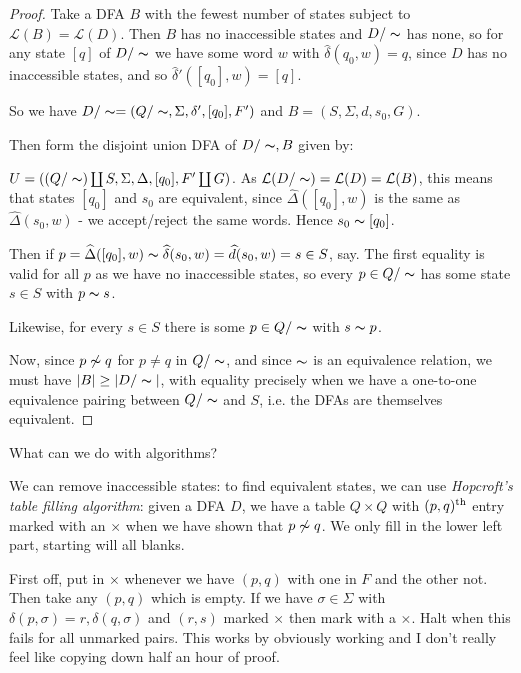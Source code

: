 \documentclass[10pt,a4paper]{article}
\begin{document}
\begin{proof}
Take a DFA $B$ with the fewest number of states subject to $\mathcal{L}(B) = \mathcal{L}(D)$. Then $B$ has no inaccessible states and $D/\thicksim$ has none, so for any state $[q]$ of $D/\thicksim$ we have some word $w$ with $\hat{\delta}(q_0, w) = q$, since $D$ has no inaccessible states, and so $\hat{\delta}'([q_0],w) = [q]$.

So we have $D/\thicksim = (Q/\thicksim, \Sigma, \delta', [q_0], F')$ and $B = (S,\Sigma, d, s_0, G)$.

Then form the disjoint union DFA of $D/\thicksim, B$ given by:

$U = ((Q/\thicksim )\coprod S, \Sigma, \Delta, [q_0], F'\coprod G)$. As $\mathcal{L}(D/\thicksim) = \mathcal{L}(D) = \mathcal{L}(B)$, this means that states $[q_0]$ and $s_0$ are equivalent, since $\hat{\Delta}([q_0],w)$ is the same as $\hat{\Delta}(s_0, w)$ - we accept/reject the same words. Hence $s_0 \thicksim [q_0]$.

Then if $p = \hat{\Delta}([q_0],w) \thicksim \hat{\delta}(s_0, w) = \hat{d}(s_0, w) = s \in S$, say. The first equality is valid for all $p$ as we have no inaccessible states, so every $p \in Q/\thicksim$ has some state $s \in S$ with $p \thicksim s$.

Likewise, for every $s \in S$ there is some $p \in Q/\thicksim$ with $s \thicksim p$.

Now, since $p \not\thicksim q$ for $p\neq q$ in $Q/\thicksim$, and since $\thicksim$ is an equivalence relation, we must have $|B| \geq |D/\thicksim|$, with equality precisely when we have a one-to-one equivalence pairing between $Q/\thicksim$ and $S$, i.e. the DFAs are themselves equivalent.
\end{proof}
What can we do with algorithms?

We can remove inaccessible states: to find equivalent states, we can use \emph{Hopcroft's table filling algorithm}: given a DFA $D$, we have a table $Q \times Q$ with $(p,q)\th$ entry marked with an $\times$ when we have shown that $p \not\thicksim q$. We only fill in the lower left part, starting will all blanks.

First off, put in $\times$ whenever we have $(p,q)$ with one in $F$ and the other not. Then take any $(p,q)$ which is empty. If we have $\sigma \in \Sigma$ with $\delta(p, \sigma) = r, \delta(q,\sigma)$ and $(r,s)$ marked $\times$ then mark with a $\times$. Halt when this fails for all unmarked pairs. This works by obviously working and I don't really feel like copying down half an hour of proof.
\end{document}
